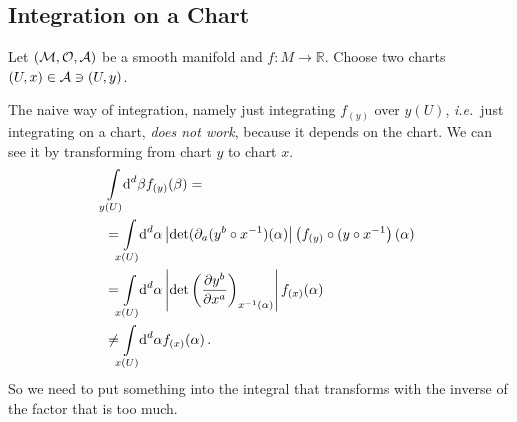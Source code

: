 \subsection{Integration on a Chart}
Let $(\mathcal{M}, \mathcal{O}, \mathcal{A})$ be a smooth manifold and $f: M\to\mathbb{R}$.
Choose two charts $(U,x)\in \mathcal{A} \ni (U,y)$.
\begin{center}
\end{center}
The naive way of integration, namely just integrating $f_{(y)}$ over $y(U)$, \textit{i.e.}\
just integrating on a chart, \textit{does not work}, because it depends on the chart.
We can see it by transforming from chart $y$ to chart $x$.
\begin{align}
    \nonumber&\int\limits_{\mathclap{y(U)}} \difff^d\! \beta f_{(y)} (\beta)= \\
    \nonumber&=\int\limits_{\mathclap{x(U)}} \difff^d\! \alpha \left| \det(\partial_a (y^b\circ x^{-1})(\alpha) \right| \left( f_{(y)} \circ (y\circ x^{-1} \right)(\alpha)\\
            \nonumber&=\int\limits_{\mathclap{x(U)}} \difff^d\! \alpha \left| \det\left( \frac{\partial y^b}{\partial x^a} \right)_{x^{-1}(\alpha)} \right| f_{(x)}(\alpha)\\
            &\neq \int\limits_{\mathclap{x(U)}} \difff^d\! \alpha f_{(x)} (\alpha)\,.
            \label{eq:naiveIntegral}
        \end{align}
        So we need to put something into the integral that transforms with the inverse of the factor that is too much.

